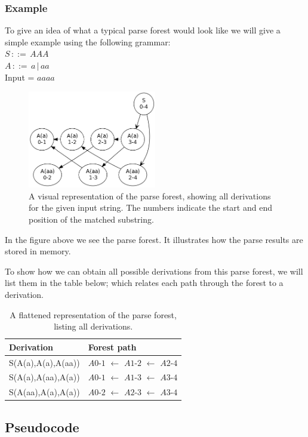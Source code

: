\documentclass[a4paper,10pt]{article}
\begin{document}
\pagebreak
\subsubsection{Example}
To give an idea of what a typical parse forest would look like we will give a simple example using the following grammar:\\
$S\,::=\,AAA$\\
$A\,::=\,a\,|\,aa$\\
Input = $aaaa$

\begin{figure}[H]
\centering
\includegraphics[width=0.5\textwidth]{a_aa-forest.png}
\caption{A visual representation of the parse forest, showing all derivations for the given input string. The numbers indicate the start and end position of the matched substring.}
\end{figure}

In the figure above we see the parse forest. It illustrates how the parse results are stored in memory.

To show how we can obtain all possible derivations from this parse forest, we will list them in the table below; which relates each path through the forest to a derivation.

\begin{table}[H]
\centering
\begin{tabular}{ p{15em} p{15em} }
Derivation & Forest path\\
\hline
S(A(a),A(a),A(aa)) & $A0$-$1$ $\leftarrow$ $A1$-$2$ $\leftarrow$ $A2$-$4$\\
S(A(a),A(aa),A(a)) & $A0$-$1$ $\leftarrow$ $A1$-$3$ $\leftarrow$ $A3$-$4$\\
S(A(aa),A(a),A(a)) & $A0$-$2$ $\leftarrow$ $A2$-$3$ $\leftarrow$ $A3$-$4$
\end{tabular}
\caption{A flattened representation of the parse forest, listing all derivations.}
\end{table}

\pagebreak
\subsection{Pseudocode}
\end{document}
